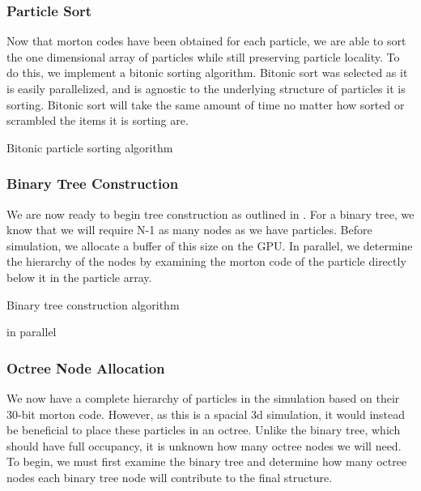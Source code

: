 \documentclass{thesis}
\begin{document}
\subsubsection{Particle Sort}
Now that morton codes have been obtained for each particle, we are able to sort the one dimensional array of particles while still preserving particle locality. To do this, we implement a bitonic sorting algorithm. Bitonic sort was selected as it is easily parallelized, and is agnostic to the underlying structure of particles it is sorting. Bitonic sort will take the same amount of time no matter how sorted or scrambled the items it is sorting are.
\begin{algorithm}
    \label{alg:BitonicParticleSort}
    \caption{Bitonic particle sorting algorithm}
    \begin{algorithmic}
        \EndFor
    \end{algorithmic}
\end{algorithm}
\subsubsection{Binary Tree Construction}
We are now ready to begin tree construction as outlined in \cite{Karas:2012}. For a binary tree, we know that we will require N-1 as many nodes as we have particles. Before simulation, we allocate a buffer of this size on the GPU. In parallel, we determine the hierarchy of the nodes by examining the morton code of the particle directly below it in the particle array.
\begin{algorithm}
    \label{alg:BinaryTreeConstruction}
    \caption{Binary tree construction algorithm}
    \begin{algorithmic}
         in parallel
        \EndFor
    \end{algorithmic}
\end{algorithm}
\subsubsection{Octree Node Allocation}
We now have a complete hierarchy of particles in the simulation based on their 30-bit morton code. However, as this is a spacial 3d simulation, it would instead be beneficial to place these particles in an octree. Unlike the binary tree, which should have full occupancy, it is unknown how many octree nodes we will need. To begin, we must first examine the binary tree and determine how many octree nodes each binary tree node will contribute to the final structure.
\end{document}
